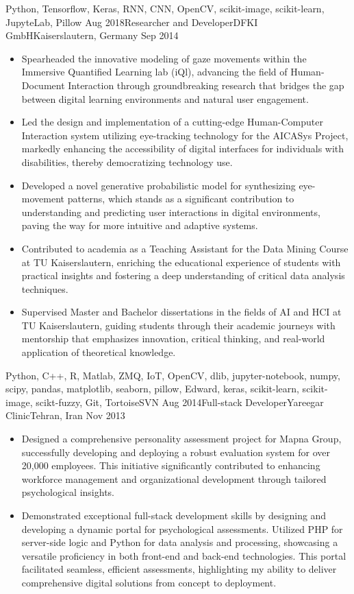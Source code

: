 \begin{experiences}
{\begin{itemize}
		\end{itemize}
	}
	{Python, Tensorflow, Keras, RNN, CNN, OpenCV, scikit-image, scikit-learn, JupyteLab, Pillow}
	\emptySeparator
	\experience
	{Aug 2018}{Researcher and Developer}{DFKI GmbH}{Kaiserslautern, Germany}
	{Sep 2014} {
		\begin{itemize}
			\item Spearheaded the innovative modeling of gaze movements within the Immersive Quantified Learning lab (iQl), advancing the field of Human-Document Interaction through groundbreaking research that bridges the gap between digital learning environments and natural user engagement.
			\item Led the design and implementation of a cutting-edge Human-Computer Interaction system utilizing eye-tracking technology for the AICASys Project, markedly enhancing the accessibility of digital interfaces for individuals with disabilities, thereby democratizing technology use.
			\item Developed a novel generative probabilistic model for synthesizing eye-movement patterns, which stands as a significant contribution to understanding and predicting user interactions in digital environments, paving the way for more intuitive and adaptive systems.
			\item Contributed to academia as a Teaching Assistant for the Data Mining Course at TU Kaiserslautern, enriching the educational experience of students with practical insights and fostering a deep understanding of critical data analysis techniques.
			\item Supervised Master and Bachelor dissertations in the fields of AI and HCI at TU Kaiserslautern, guiding students through their academic journeys with mentorship that emphasizes innovation, critical thinking, and real-world application of theoretical knowledge.

		\end{itemize}
	}
	{Python, C++, R, Matlab, ZMQ, IoT, OpenCV, dlib, jupyter-notebook, numpy, scipy, pandas, matplotlib, seaborn, pillow, Edward, keras, scikit-learn, scikit-image, scikt-fuzzy, Git, TortoiseSVN}
	\emptySeparator
	\experience
	{Aug 2014}{Full-stack Developer}{Yareegar Clinic}{Tehran, Iran}
	{Nov 2013} {
		\begin{itemize}
			\item Designed a comprehensive personality assessment project for Mapna Group, successfully developing and deploying a robust evaluation system for over 20,000 employees. This initiative significantly contributed to enhancing workforce management and organizational development through tailored psychological insights.
			\item Demonstrated exceptional full-stack development skills by designing and developing a dynamic portal for psychological assessments. Utilized PHP for server-side logic and Python for data analysis and processing, showcasing a versatile proficiency in both front-end and back-end technologies. This portal facilitated seamless, efficient assessments, highlighting my ability to deliver comprehensive digital solutions from concept to deployment.


\end{itemize}}
\end{experiences}
